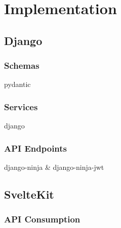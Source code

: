 \chapter{Implementation}

\section{Django}

\subsection{Schemas}
pydantic
\subsection{Services}
django
\subsection{API Endpoints}
django-ninja \& django-ninja-jwt

\section{SvelteKit}


\subsection{API Consumption}





